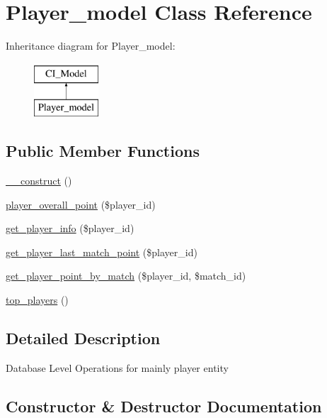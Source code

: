 \hypertarget{class_player__model}{}\section{Player\+\_\+model Class Reference}
\label{class_player__model}
Inheritance diagram for Player\+\_\+model\+:\begin{figure}[H]
\begin{center}
\leavevmode
\includegraphics[height=2.000000cm]{class_player__model}
\end{center}
\end{figure}
\subsection*{Public Member Functions}
\begin{DoxyCompactItemize}
\item 
\hyperlink{class_player__model_a095c5d389db211932136b53f25f39685}{\+\_\+\+\_\+construct} ()
\item 
\hyperlink{class_player__model_a07af3409fdb921cae359a05793a02d3c}{player\+\_\+overall\+\_\+point} (\$player\+\_\+id)
\item 
\hyperlink{class_player__model_a3570a3070d8b6e1d62bca39fe092ec9f}{get\+\_\+player\+\_\+info} (\$player\+\_\+id)
\item 
\hyperlink{class_player__model_a5b0fcf5ef1cea51b33d310b9efe52033}{get\+\_\+player\+\_\+last\+\_\+match\+\_\+point} (\$player\+\_\+id)
\item 
\hyperlink{class_player__model_a0ec1969e80f87e7ab17a27d20feec5af}{get\+\_\+player\+\_\+point\+\_\+by\+\_\+match} (\$player\+\_\+id, \$match\+\_\+id)
\item 
\hyperlink{class_player__model_acc3cf15d3bd05c5420746f0218e453df}{top\+\_\+players} ()
\end{DoxyCompactItemize}


\subsection{Detailed Description}
Database Level Operations for mainly {\ttfamily player} entity 

\subsection{Constructor \& Destructor Documentation}
\hypertarget{class_player__model_a095c5d389db211932136b53f25f39685}{}
